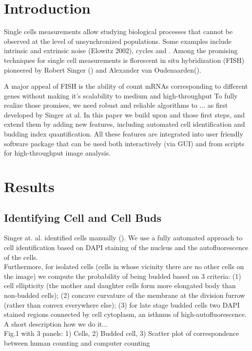 \documentclass[10pt]{article}
\begin{document}
\begin{spacing}{1.5}
\section*{Introduction}

Single cells measurements allow studying biological processes that cannot be observed at the level of unsynchronized populations. Some examples include intrinsic and extrinsic noise (Elowitz 2002), cycles and . Among the promising techniques for single cell measurements is florescent in situ hybridization (FISH) pioneered by Robert Singer () and Alexander van Oudenaarden(). 

A major appeal of FISH is the ability of count mRNAs corresponding to different genes without making 
it's scalability to medium and high-throughput      
To fully realize those promises, we need robust and reliable algorithms to ... as first developed by Singer at al. In this paper we build upon and those first steps, and extend them by adding new features, including automated cell identification and budding index quantification. All these features are integrated into user friendly software package that can be used both interactively (via GUI) and from scripts for high-throughput image analysis.   




\section*{Results}

\subsection*{Identifying Cell and Cell Buds}
Singer at. al. identified cells manually (). We use a fully automated approach to cell identification based on DAPI staining of the nucleus and the autofluorescence of the cells. \\

Furthermore, for isolated cells (cells in whose vicinity there are no other cells on the image) we compute the probability of being budded based on $3$ criteria: (1) cell ellipticity (the mother and daughter cells form more elongated body than non-budded cells); (2) concave curvature of the membrane at the division furrow (rather than convex everywhere else); (3) for late stage budded cells two DAPI stained regions connected by cell cytoplasm, an isthmus of high-autofluorescence.            
A short description how we do it...\\
Fig.1 with 3 panels: 1) Cells, 2) Budded cell, 3) Scatter plot of correspondence between human counting and computer counting 


\end{spacing}
\end{document}
